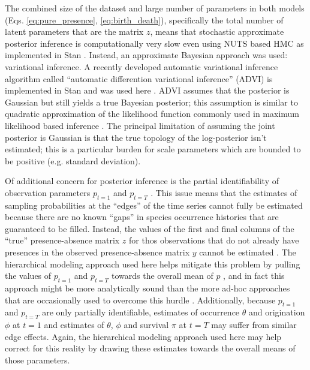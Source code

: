 
The combined size of the dataset and large number of parameters in both models (Eqs. \ref{eq:pure_presence}, \ref{eq:birth_death}), specifically the total number of latent parameters that are the matrix \(z\), means that stochastic approximate posterior inference is computationally very slow even using NUTS based HMC as implemented in Stan \citep{StanDevelopmentTeam2016}. Instead, an approximate Bayesian approach was used: variational inference. A recently developed automatic variational inference algorithm called ``automatic differention variational inference'' (ADVI) is implemented in Stan and was used here \citep{Kucukelbir2015,StanDevelopmentTeam2016}. ADVI assumes that the posterior is Gaussian but still yields a true Bayesian posterior; this assumption is similar to quadratic approximation of the likelihood function commonly used in maximum likelihood based inference \citep{McElreath2016}. The principal limitation of assuming the joint posterior is Gaussian is that the true topology of the log-posterior isn't estimated; this is a particular burden for scale parameters which are bounded to be positive (e.g. standard deviation).

Of additional concern for posterior inference is the partial identifiability of observation parameters \(p_{t = 1}\) and \(p_{t = T}\) \citep{Royle2008}. This issue means that the estimates of sampling probabilities at the ``edges'' of the time series cannot fully be estimated because there are no known ``gaps'' in species occurrence histories that are guaranteed to be filled. Instead, the values of the first and final columns of the ``true'' presence-absence matrix \(z\) for thos observations that do not already have presences in the observed presence-absence matrix \(y\) cannot be estimated \citep{Royle2008}. The hierarchical modeling approach used here helps mitigate this problem by pulling the values of \(p_{t = 1}\) and \(p_{t = T}\) towards the overall mean of \(p\) \citep{Gelman2013d}, and in fact this approach might be more analytically sound than the more ad-hoc approaches that are occasionally used to overcome this hurdle \citep{Royle2008}. Additionally, because \(p_{t = 1}\) and \(p_{t = T}\) are only partially identifiable, estimates of occurrence \(\theta\) and origination \(\phi\) at \(t = 1\) and estimates of \(\theta\), \(\phi\) and survival \(\pi\) at \(t = T\) may suffer from similar edge effects. Again, the hierarchical modeling approach used here may help correct for this reality by drawing these estimates towards the overall means of those parameters.


